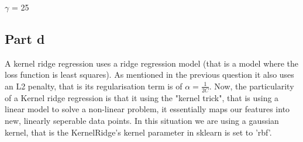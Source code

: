 \documentclass[10pt]{article}
\begin{document}
$\gamma$ = 25
\begin{figure}[H]    
\end{figure}

\subsection*{Part d}
A kernel ridge regression uses a ridge regression model (that is a model where the loss function is least squares). As mentioned
in the previous question it also uses an L2 penalty, that is its regularisation term is of $\alpha = \frac{1}{2C}$. 
Now, the particularity of a Kernel ridge regression is that it using the "kernel trick", that is using a linear
model to solve a non-linear problem, it essentially maps our features into new, linearly seperable data points. In this
situation we are using a gaussian kernel, that is the KernelRidge's kernel parameter in sklearn is set to 'rbf'.
\end{document}
